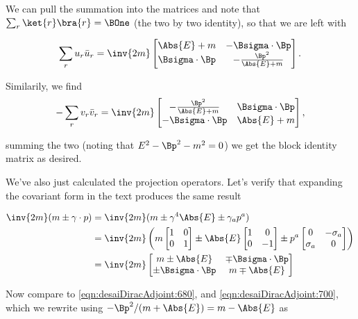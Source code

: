 We can pull the summation into the matrices and note that $\sum_r \ket{r}\bra{r} = \BOne$ (the two by two identity), so that we are left with

\begin{equation}\label{eqn:desaiDiracAdjoint:680}
\sum_r u_r \bar{u}_r 
=
\inv{2m}
\begin{bmatrix}
\Abs{E} + m & -\Bsigma \cdot \Bp \\
\Bsigma \cdot \Bp &
-\frac{\Bp^2}{\Abs{E} + m} 
\end{bmatrix}.
\end{equation}

Similarily, we find
\begin{equation}\label{eqn:desaiDiracAdjoint:700}
-\sum_r v_r \bar{v}_r 
=
\inv{2m}
\begin{bmatrix}
-\frac{\Bp^2}{\Abs{E} + m}  & \Bsigma \cdot \Bp \\
-\Bsigma \cdot \Bp  & \Abs{E} + m 
\end{bmatrix},
\end{equation}

summing the two (noting that $E^2 - \Bp^2 - m^2 = 0$) we get the block identity matrix as desired.

We've also just calculated the projection operators.  Let's verify that expanding the covariant form in the text produces the same result

\begin{align*}
\inv{2m}(m \pm \gamma \cdot p) 
&=
\inv{2m}(m \pm \gamma^4 \Abs{E} \pm \gamma_a p^a ) \\
&=
\inv{2m}
\left(
m
\begin{bmatrix}
1 & 0 \\
0 & 1
\end{bmatrix}
\pm \Abs{E}
\begin{bmatrix}
1 & 0 \\
0 & -1
\end{bmatrix}
\pm p^a
\begin{bmatrix}
0 & -\sigma_a \\
\sigma_a & 0 
\end{bmatrix}
\right) \\
&=
\inv{2m}
\begin{bmatrix}
m \pm \Abs{E} & \mp \Bsigma \cdot \Bp \\
\pm \Bsigma \cdot \Bp & m \mp \Abs{E} 
\end{bmatrix}
\end{align*}

Now compare to \ref{eqn:desaiDiracAdjoint:680}, and \ref{eqn:desaiDiracAdjoint:700}, which we rewrite using $-\Bp^2/(m + \Abs{E}) = m - \Abs{E}$ as 

